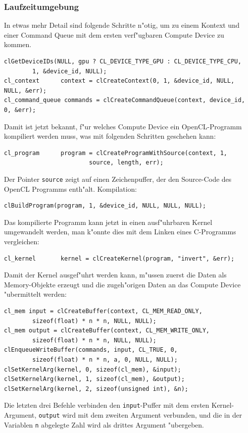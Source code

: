 \subsubsection{Laufzeitumgebung}
In etwas mehr Detail sind folgende Schritte n"otig, um zu einem
Kontext und einer Command Queue mit dem ersten verf"ugbaren
Compute Device zu kommen.
\begin{verbatim}
clGetDeviceIDs(NULL, gpu ? CL_DEVICE_TYPE_GPU : CL_DEVICE_TYPE_CPU,
        1, &device_id, NULL);
cl_context      context = clCreateContext(0, 1, &device_id, NULL, NULL, &err);
cl_command_queue commands = clCreateCommandQueue(context, device_id, 0, &err);
\end{verbatim}
Damit ist jetzt bekannt, f"ur welches Compute Device ein OpenCL-Programm
kompiliert werden muss, was mit folgenden Schritten geschehen kann:
\begin{verbatim}
cl_program      program = clCreateProgramWithSource(context, 1,
                        source, length, err);
\end{verbatim}
Der Pointer \verb+source+ zeigt auf einen Zeichenpuffer, der den Source-Code
des OpenCL Programms enth"alt. Kompilation:
\begin{verbatim}
clBuildProgram(program, 1, &device_id, NULL, NULL, NULL);
\end{verbatim}
Das kompilierte Programm kann jetzt in einen ausf"uhrbaren
Kernel umgewandelt werden, man k"onnte dies mit dem Linken eines
C-Programms vergleichen:
\begin{verbatim}
cl_kernel       kernel = clCreateKernel(program, "invert", &err);
\end{verbatim}

Damit der Kernel ausgef"uhrt werden kann, m"ussen zuerst die Daten
als Memory-Objekte erzeugt und die zugeh"origen Daten an das Compute Device
"ubermittelt werden:
\begin{verbatim}
cl_mem input = clCreateBuffer(context, CL_MEM_READ_ONLY,
        sizeof(float) * n * n, NULL, NULL);
cl_mem output = clCreateBuffer(context, CL_MEM_WRITE_ONLY,
        sizeof(float) * n * n, NULL, NULL);
clEnqueueWriteBuffer(commands, input, CL_TRUE, 0,
        sizeof(float) * n * n, a, 0, NULL, NULL);
clSetKernelArg(kernel, 0, sizeof(cl_mem), &input);
clSetKernelArg(kernel, 1, sizeof(cl_mem), &output);
clSetKernelArg(kernel, 2, sizeof(unsigned int), &n);
\end{verbatim}
Die letzten drei Befehle verbinden den \verb+input+-Puffer mit dem ersten
Kernel-Argument, \verb+output+ wird mit dem zweiten
Argument verbunden, und die in der Variablen \verb+n+ abgelegte
Zahl wird als drittes Argument "ubergeben.

